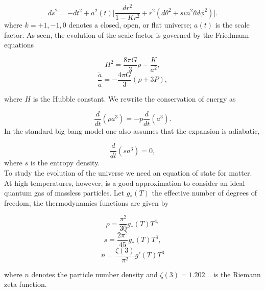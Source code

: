 \documentclass[11pt,a4paper,twoside]{book}
\begin{document}
\begin{equation}
	\label{metricCh2}	
	ds^{2}   = - dt^{2} + a^{2}(t)\Big[\frac{dr^{2}}{1-Kr^{2}}  +  r^{2}(d\theta^{2} + sin^{2} \theta d\phi^{2})\Big] . 
\end{equation}
where $ k=+1,-1,0 $ denotes a closed, open, or flat universe; $ a(t) $ is the scale factor.
As seen, the evolution of the scale factor is governed by the Friedmann equations

\begin{equation}
	\label{friedmannEquations1Chap2}
	H^{2}=\frac{8\pi G}{3}\rho - \frac{K}{a^{2}},
\end{equation}
\begin{equation}
	\label{friedmannEquations2Chap2}	
	\frac{\ddot{a}}{a} = -\frac{4\pi G}{3}(\rho + 3P),
\end{equation}

where $ H  $ is the Hubble constant. We rewrite the conservation of energy as

\begin{equation}
\label{Chap2:ConservationEnergy}
\frac{d}{dt}(\rho a^{3})=-p\frac{d}{dt}(a^{3}).
\end{equation}
In the standard big-bang model one also assumes that the expansion is adiabatic,

\begin{equation}
\label{Chap2:entropy}
\frac{d}{dt}(sa^{3})=0,
\end{equation}
where $ s $ is the entropy density.\\
To study the evolution of the universe we need an equation of state for matter. At high temperatures, however, is a good approximation to consider an ideal quantum gas of massless particles. Let $ g_{*}(T) $ the effective number of degrees of freedom, the thermodynamics functions are given by

\begin{equation}
\label{Chap2EnergyDensity}
\rho=\frac{\pi^{2}}{30}	g_{*}(T)T^{4,}	
\end{equation}
\begin{equation}
\label{s}
s=\frac{2\pi^{2}}{45}g_{*}(T)T^{3},
\end{equation}
\begin{equation}
	\label{n}
	n=\frac{\zeta(3)}{\pi^{2}}g'(T)T^{3}
\end{equation}

where $ n $ denotes the particle number density and $\zeta(3)=1.202...$ is the Riemann zeta function.
\end{document}
